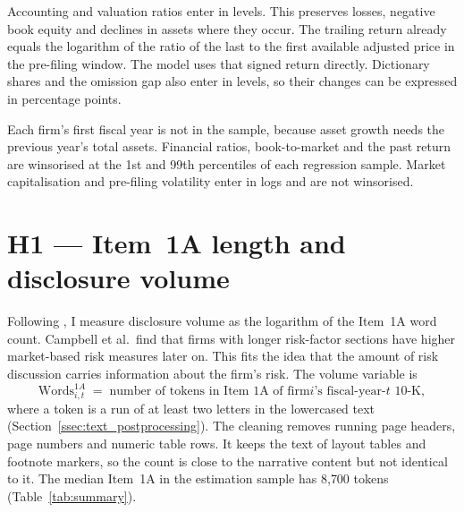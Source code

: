 Accounting and valuation ratios enter in levels. This preserves losses, negative book equity and declines in assets where they occur. The trailing return already equals the logarithm of the ratio of the last to the first available adjusted price in the pre-filing window. The model uses that signed return directly. Dictionary shares and the omission gap also enter in levels, so their changes can be expressed in percentage points.

Each firm's first fiscal year is not in the
sample, because asset growth needs the previous year's total assets.
Financial ratios, book-to-market and the past return are winsorised at the
1st and 99th percentiles of each regression sample. Market capitalisation and
pre-filing volatility enter in logs and are not winsorised.


\section{H1 --- Item~1A length and disclosure volume}
\label{sec:h1}

Following \textcite{campbell2014}, I measure disclosure volume as the
logarithm of the Item~1A word count. Campbell et al.\ find that firms with
longer risk-factor sections have higher market-based risk measures later on.
This fits the idea that the amount of risk discussion carries information
about the firm's risk. The volume variable is
\begin{equation}
\text{Words}^{1A}_{i,t} \;=\; \text{number of tokens in Item~1A of firm
$i$'s fiscal-year-$t$ 10-K},
\end{equation}
where a token is a run of at least two letters in the lowercased text
(Section~\ref{ssec:text_postprocessing}). The cleaning removes running
page headers, page numbers and numeric table rows. It keeps the text of
layout tables and footnote markers, so the count is close to the narrative
content but not identical to it. The median Item~1A in the estimation sample
has 8{,}700 tokens (Table~\ref{tab:summary}).

